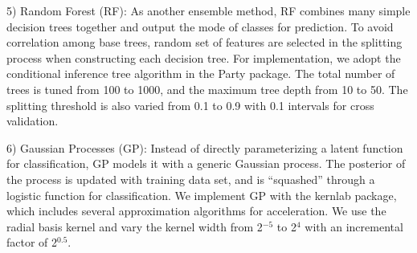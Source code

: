 5) Random Forest (RF): As another ensemble method, RF combines many simple decision trees together and output the mode of classes for prediction. To avoid correlation among base trees, random set of features are selected in the splitting process when constructing each decision tree. For implementation, we adopt the conditional inference tree algorithm in the Party package. The total number of trees is tuned from 100 to 1000, and the maximum tree depth from 10 to 50. The splitting threshold is also varied from 0.1 to 0.9 with 0.1 intervals for cross validation.

6) Gaussian Processes (GP): Instead of directly parameterizing a latent function for classification, GP models it with a generic Gaussian process. The posterior of the process is updated with training data set, and is “squashed” through a logistic function for classification. We implement GP with the kernlab package, which includes several approximation algorithms for acceleration. We use the radial basis kernel and vary the kernel width from 2$^{-5}$ to 2$^4$ with an incremental factor of 2$^{0.5}$.





